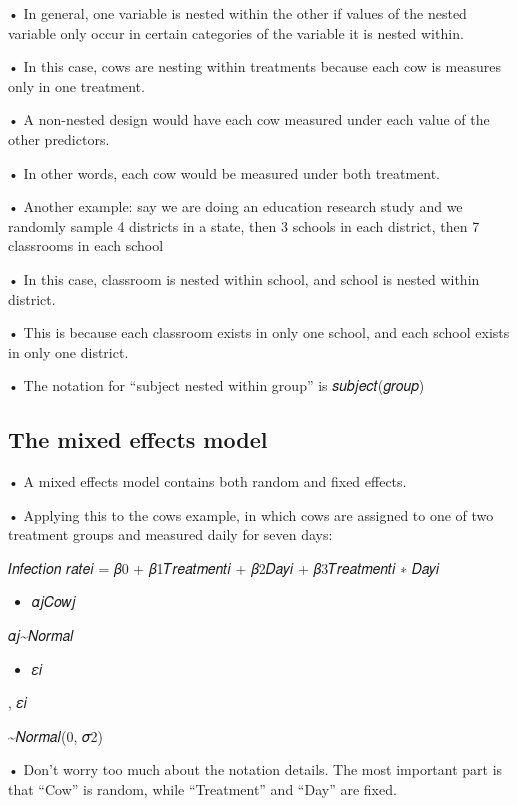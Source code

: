 \documentclass[
  letterpaper,
  DIV=11,
  numbers=noendperiod]{scrreprt}
\providecommand{\tightlist}{%
  \setlength{\itemsep}{0pt}\setlength{\parskip}{0pt}}\usepackage{longtable,booktabs,array}
\begin{document}
• In general, one variable is nested within the other if values of the
nested variable only occur in certain categories of the variable it is
nested within.

• In this case, cows are nesting within treatments because each cow is
measures only in one treatment.

• A non-nested design would have each cow measured under each value of
the other predictors.

• In other words, each cow would be measured under both treatment.

• Another example: say we are doing an education research study and we
randomly sample 4 districts in a state, then 3 schools in each district,
then 7 classrooms in each school

• In this case, classroom is nested within school, and school is nested
within district.

• This is because each classroom exists in only one school, and each
school exists in only one district.

• The notation for ``subject nested within group'' is 𝑠𝑢𝑏𝑗𝑒𝑐𝑡(𝑔𝑟𝑜𝑢𝑝)

\hypertarget{the-mixed-effects-model}{%
\subsection{The mixed effects model}\label{the-mixed-effects-model}}

• A mixed effects model contains both random and fixed effects.

• Applying this to the cows example, in which cows are assigned to one
of two treatment groups and measured daily for seven days:

𝐼𝑛𝑓𝑒𝑐𝑡𝑖𝑜𝑛 𝑟𝑎𝑡𝑒𝑖 = 𝛽0 + 𝛽1𝑇𝑟𝑒𝑎𝑡𝑚𝑒𝑛𝑡𝑖 + 𝛽2𝐷𝑎𝑦𝑖 + 𝛽3𝑇𝑟𝑒𝑎𝑡𝑚𝑒𝑛𝑡𝑖 ∗ 𝐷𝑎𝑦𝑖

\begin{itemize}
\tightlist
\item
  𝛼𝑗𝐶𝑜𝑤𝑗
\end{itemize}

𝛼𝑗\textasciitilde 𝑁𝑜𝑟𝑚𝑎𝑙

\begin{itemize}
\tightlist
\item
  𝜀𝑖
\end{itemize}

, 𝜀𝑖

\textasciitilde 𝑁𝑜𝑟𝑚𝑎𝑙(0, 𝜎2)

• Don't worry too much about the notation details. The most important
part is that ``Cow'' is random, while ``Treatment'' and ``Day'' are
fixed.
\end{document}
